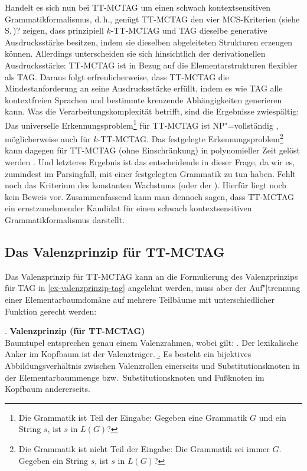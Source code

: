 Handelt es sich nun bei TT-MCTAG um einen schwach kontextsensitiven Grammatikformalismus, d.\,h., genügt TT-MCTAG den vier MCS-Kriterien (siehe S.\,\pageref{ex-kriterien-mcs})? \cite{Kallmeyer:Parmentier:08} zeigen, dass prinzipiell $k$-TT-MCTAG und TAG dieselbe generative Ausdrucksstärke besitzen, indem sie dieselben abgeleiteten Strukturen erzeugen können. Allerdings unterscheiden sie sich hinsichtlich der derivationellen Ausdrucksstärke: TT-MCTAG ist in Bezug auf die Elementarstrukturen flexibler als TAG. Daraus folgt erfreulicherweise, dass TT-MCTAG die Mindestanforderung an seine Ausdrucksstärke erfüllt, indem es wie TAG alle kontextfreien Sprachen und bestimmte kreuzende Abhängigkeiten generieren kann. Was die Verarbeitungskomplexität betrifft, sind die Ergebnisse zwiespältig: Das universelle Erkennungsproblem\footnote{Die Grammatik ist Teil der Eingabe: Gegeben eine Grammatik $G$ und ein String $s$, ist $s$ in $L(G)$?} für TT-MCTAG ist NP"=vollständig \citep{Sogaard:Lichte:Maier:07}, möglicherweise auch für $k$-TT-MCTAG. Das festgelegte Erkennungsproblem\footnote{Die Grammatik ist nicht Teil der  Eingabe: Die Grammatik sei immer $G$. Gegeben ein String $s$, ist $s$ in $L(G)$?} kann dagegen für TT-MCTAG (ohne Einschränkung) in polynomieller Zeit gelöst werden \citep{Kallmeyer:Satta:09}. Und letzteres Ergebnis ist das entscheidende in dieser Frage, da wir es, zumindest im Parsingfall, mit einer festgelegten Grammatik zu tun haben. Fehlt noch das Kriterium des konstanten Wachstums (oder der ). Hierfür liegt noch kein Beweis vor. Zusammenfassend kann man dennoch sagen, dass TT-MCTAG ein ernstzunehmender Kandidat für einen schwach kontextsensitiven Grammatikformalismus darstellt.


\subsection{Das Valenzprinzip für TT-MCTAG}

Das Valenzprinzip für TT-MCTAG kann an die Formulierung des Valenzprinzips für TAG in \ref{ex-valenzprinzip-tag} angelehnt werden, muss aber der Auf"|trennung einer Elementarbaumdomäne auf mehrere Teilbäume mit unterschiedlicher Funktion gerecht werden:

\ex. \label{ex-valenzprinzip-mctag}{\bf Valenzprinzip (für TT-MCTAG)} \\ 
Baumtupel entsprechen genau einem Valenzrahmen, wobei gilt:
\a. Der lexikalische Anker im Kopfbaum ist der Valenzträger.
\b. Es besteht ein bijektives Abbildungsverhältnis zwischen Valenzrollen einerseits und Substitutionsknoten in der Elementarbaummenge bzw.\ Substitutionsknoten und Fu\ss knoten im Kopfbaum andererseits.

